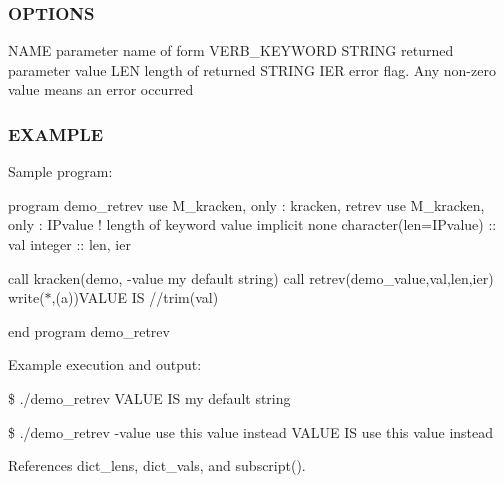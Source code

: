 \subsubsection*{O\+P\+T\+I\+O\+NS}

\begin{DoxyVerb} NAME    parameter name of form VERB_KEYWORD
 STRING  returned parameter value
 LEN     length of returned STRING
 IER     error flag. Any non-zero value means an error occurred
\end{DoxyVerb}


\subsubsection*{E\+X\+A\+M\+P\+LE}

Sample program\+:

program demo\+\_\+retrev use M\+\_\+kracken, only \+: kracken, retrev use M\+\_\+kracken, only \+: I\+Pvalue ! length of keyword value implicit none character(len=I\+Pvalue) \+:\+: val integer \+:\+: len, ier

call kracken(\textquotesingle{}demo\textquotesingle{}, \textquotesingle{} -\/value my default string\textquotesingle{}) call retrev(\textquotesingle{}demo\+\_\+value\textquotesingle{},val,len,ier) write($\ast$,\textquotesingle{}(a)\textquotesingle{})\textquotesingle{}V\+A\+L\+UE IS \textquotesingle{}//trim(val)

end program demo\+\_\+retrev

Example execution and output\+:

\$ ./demo\+\_\+retrev V\+A\+L\+UE IS my default string

\$ ./demo\+\_\+retrev -\/value use this value instead V\+A\+L\+UE IS use this value instead 

References dict\+\_\+lens, dict\+\_\+vals, and subscript().

